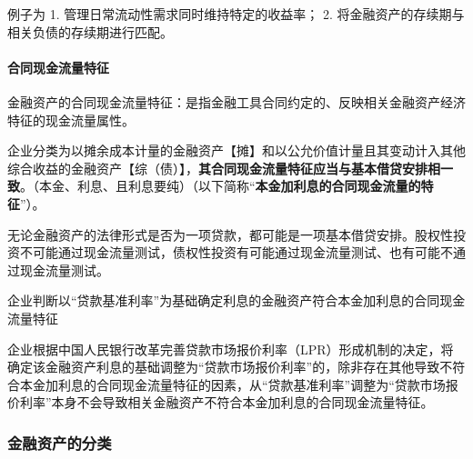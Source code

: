 \documentclass[UTF8,12pt]{ctexart}
\numberwithin{equation}{section} %
\numberwithin{figure}{section}
\numberwithin{table}{section}
\begin{document}
	例子为
	1.	管理日常流动性需求同时维持特定的收益率；
	2.	将金融资产的存续期与相关负债的存续期进行匹配。
	
	\paragraph{合同现金流量特征}
	金融资产的合同现金流量特征：是指金融工具合同约定的、反映相关金融资产经济特征的现金流量属性。
	
	企业分类为以摊余成本计量的金融资产【摊】和以公允价值计量且其变动计入其他综合收益的金融资产【综（债）】，\textbf{其合同现金流量特征应当与基本借贷安排相一致}。（本金、利息、且利息要纯）（以下简称“\textbf{本金加利息的合同现金流量的特征}”）。
	
	无论金融资产的法律形式是否为一项贷款，都可能是一项基本借贷安排。股权性投资不可能通过现金流量测试，债权性投资有可能通过现金流量测试、也有可能不通过现金流量测试。
	
	企业判断以“贷款基准利率”为基础确定利息的金融资产符合本金加利息的合同现金流量特征
	
	企业根据中国人民银行改革完善贷款市场报价利率（LPR）形成机制的决定，将确定该金融资产利息的基础调整为“贷款市场报价利率”的，除非存在其他导致不符合本金加利息的合同现金流量特征的因素，从“贷款基准利率”调整为“贷款市场报价利率”本身不会导致相关金融资产不符合本金加利息的合同现金流量特征。
	
	
	
	\subsubsection{金融资产的分类}
	
\end{document}
